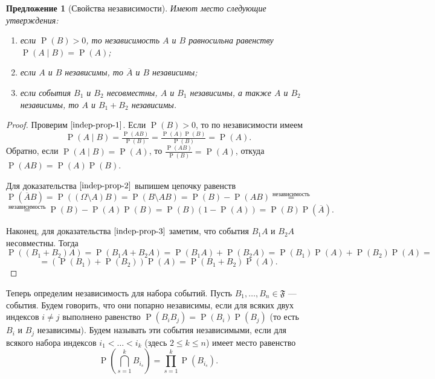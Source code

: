 \documentclass[12pt]{article}
\newtheorem{proposition}[theorem]{Предложение}
\numberwithin{theorem}{section}
\theoremstyle{definition}
\newcommand{\prob}{\operatorname{P}}
\newcommand{\defin}[2]{\hypertarget{#2}{{\color{red} #1}}}
\newcommand{\events}{\mathfrak{F}}
\begin{document}
	\begin{proposition}[Свойства независимости] \label{indep-prop}
		Имеют место следующие утверждения:
		\begin{enumerate}
			\item если $ \prob(B) > 0 $, 
			то независимость $ A $ и $ B $ равносильна равенству $ \prob(A \mid B) = \prob(A) $; \label{indep-prop-1}
			\item если $ A $ и $ B $ независимы, то $ \overline{A} $ и $ B $ независимы; \label{indep-prop-2}
			\item если события $ B_1 $ и $ B_2 $ несовместны, $ A $ и $ B_1 $ независимы, а также $ A $ и $ B_2 $ независимы, 
			то $ A $ и $ B_1 + B_2 $ независимы. \label{indep-prop-3}
		\end{enumerate}
	\end{proposition}
	
	\begin{proof}
		Проверим $ \ref{indep-prop-1} $.
		Если $ \prob(B) > 0 $, то по независимости имеем 
		$$ \prob(A \mid B) = \tfrac{\prob(AB)}{\prob(B)} = \tfrac{\prob(A)\prob(B)}{\prob(B)} = \prob(A). $$
		Обратно, если $ \prob(A \mid B) = \prob(A) $, то $ \tfrac{\prob(AB)}{\prob(B)} = \prob(A) $, откуда
		$ \prob(AB) = \prob(A)\prob(B) $.
		
		Для доказательства $ \ref{indep-prop-2} $ выпишем цепочку равенств
		$$ \prob(\overline{A}B) = \prob((\Omega \setminus A)B) = \prob(B \setminus AB) 
		= \prob(B) - \prob(AB) \overset{\text{независимость}}{=} $$ 
		$$ \overset{\text{независимость}}{=} \prob(B) - \prob(A)\prob(B) = \prob(B)(1 - \prob(A)) = \prob(B)\prob(\overline{A}). $$
		
		Наконец, для доказательства $ \ref{indep-prop-3} $ заметим, что события $ B_1A $ и $ B_2A $ несовместны.
		Тогда
		$$ \prob((B_1 + B_2)A) = \prob(B_1A + B_2A) = \prob(B_1A) + \prob(B_2A) 
		= \prob(B_1)\prob(A) + \prob(B_2)\prob(A)= $$ 
		$$ = (\prob(B_1) + \prob(B_2))\prob(A) = \prob(B_1 + B_2)\prob(A). $$
	\end{proof}

	Теперь определим независимость для набора событий.
	Пусть $ B_1, \ldots, B_n \in \events $ --- события.
	Будем говорить, что они \defin{попарно независимы}{pairwise-independent}, если для всяких двух индексов $ i \neq j $ выполнено равенство
	$ \prob(B_iB_j) = \prob(B_i)\prob(B_j) $ (то есть $ B_i $ и $ B_j $ независимы). 
	Будем называть эти события \defin{независимыми}{global-independent}, если для всякого набора индексов
	$ i_1 < \ldots < i_k $ (здесь $ 2 \leqslant k \leqslant n $) имеет место равенство
	$$ \prob\left(\bigcap\limits_{s = 1}^{k} B_{i_s}\right) = \prod_{s = 1}^{k} \prob(B_{i_s}). $$
	
\end{document}
